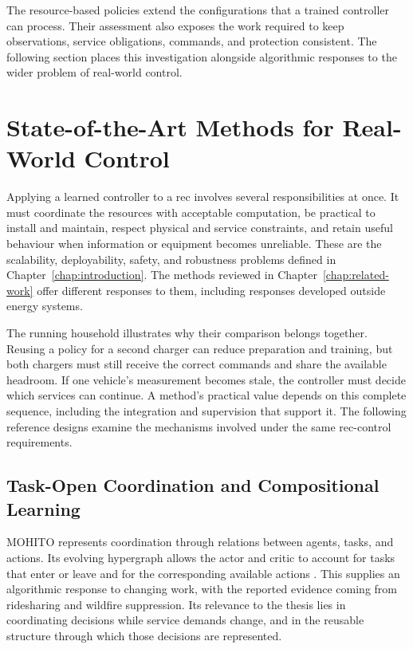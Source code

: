 The resource-based policies extend the configurations that a trained controller can process. Their assessment also exposes the work required to keep observations, service obligations, commands, and protection consistent. The following section places this investigation alongside algorithmic responses to the wider problem of real-world control.

\section{State-of-the-Art Methods for Real-World Control}
\label{sec:control-sota}
\label{sec:control-variable-references}

Applying a learned controller to a \gls{rec} involves several responsibilities at once. It must coordinate the resources with acceptable computation, be practical to install and maintain, respect physical and service constraints, and retain useful behaviour when information or equipment becomes unreliable. These are the scalability, deployability, safety, and robustness problems defined in Chapter~\ref{chap:introduction}. The methods reviewed in Chapter~\ref{chap:related-work} offer different responses to them, including responses developed outside energy systems.

The running household illustrates why their comparison belongs together. Reusing a policy for a second charger can reduce preparation and training, but both chargers must still receive the correct commands and share the available headroom. If one vehicle's measurement becomes stale, the controller must decide which services can continue. A method's practical value depends on this complete sequence, including the integration and supervision that support it. The following reference designs examine the mechanisms involved under the same \gls{rec}-control requirements.

\subsection{Task-Open Coordination and Compositional Learning}
\label{sec:control-sota-coordination}

MOHITO represents coordination through relations between agents, tasks, and actions. Its evolving hypergraph allows the actor and critic to account for tasks that enter or leave and for the corresponding available actions \parencite{anil2025mohito}. This supplies an algorithmic response to changing work, with the reported evidence coming from ridesharing and wildfire suppression. Its relevance to the thesis lies in coordinating decisions while service demands change, and in the reusable structure through which those decisions are represented.

